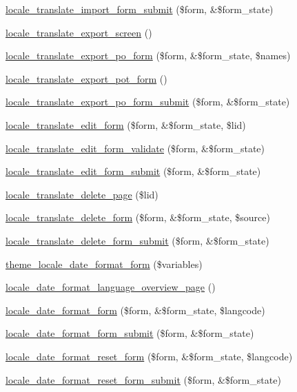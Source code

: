 \begin{DoxyCompactItemize}
\hyperlink{group__locale_gab96d979ef16a3468061ebb7e11e3210e}{locale\_\-translate\_\-import\_\-form\_\-submit} (\$form, \&\$form\_\-state)
\item 
\hyperlink{group__locale_gaa04044044d6c484553a41432db3924b4}{locale\_\-translate\_\-export\_\-screen} ()
\item 
\hyperlink{group__locale_ga5cac42d032877eb9c827b8ec0477a22e}{locale\_\-translate\_\-export\_\-po\_\-form} (\$form, \&\$form\_\-state, \$names)
\item 
\hyperlink{group__locale_ga670f0a541fc0b97da4bf4624c2afb434}{locale\_\-translate\_\-export\_\-pot\_\-form} ()
\item 
\hyperlink{group__locale_gaa8f71c53db9e03719bdeae8f594fb0ee}{locale\_\-translate\_\-export\_\-po\_\-form\_\-submit} (\$form, \&\$form\_\-state)
\item 
\hyperlink{group__locale_ga438cdd0b99e54bd87cd7058c6037db0e}{locale\_\-translate\_\-edit\_\-form} (\$form, \&\$form\_\-state, \$lid)
\item 
\hyperlink{group__locale_ga93fc48be446148e648c9a1d0f630726e}{locale\_\-translate\_\-edit\_\-form\_\-validate} (\$form, \&\$form\_\-state)
\item 
\hyperlink{group__locale_gadbeab4019dcbf389a12af893cdaad5d5}{locale\_\-translate\_\-edit\_\-form\_\-submit} (\$form, \&\$form\_\-state)
\item 
\hyperlink{group__locale_gade9664489526c09d68def1897631f4fa}{locale\_\-translate\_\-delete\_\-page} (\$lid)
\item 
\hyperlink{group__locale_gaf40a5c539ee94ae8b089275bf74e1bfe}{locale\_\-translate\_\-delete\_\-form} (\$form, \&\$form\_\-state, \$source)
\item 
\hyperlink{group__locale_ga26d7aa049b06d9de384175698f5761c7}{locale\_\-translate\_\-delete\_\-form\_\-submit} (\$form, \&\$form\_\-state)
\item 
\hyperlink{group__themeable_gafc8684caeae65fd531143223aeb5525b}{theme\_\-locale\_\-date\_\-format\_\-form} (\$variables)
\item 
\hyperlink{locale_8admin_8inc_a35d0afd550f384a5737479375ba6ada1}{locale\_\-date\_\-format\_\-language\_\-overview\_\-page} ()
\item 
\hyperlink{locale_8admin_8inc_a18cccc28c9fb6a7434ca4666e1947046}{locale\_\-date\_\-format\_\-form} (\$form, \&\$form\_\-state, \$langcode)
\item 
\hyperlink{locale_8admin_8inc_af64d7f28aed68b090c0fa48cb5f260f7}{locale\_\-date\_\-format\_\-form\_\-submit} (\$form, \&\$form\_\-state)
\item 
\hyperlink{locale_8admin_8inc_aa19c42c04454824ad9f6164ce05c9d31}{locale\_\-date\_\-format\_\-reset\_\-form} (\$form, \&\$form\_\-state, \$langcode)
\item 
\hyperlink{locale_8admin_8inc_ab87e0b22dbc23fd80968bcdf7436e565}{locale\_\-date\_\-format\_\-reset\_\-form\_\-submit} (\$form, \&\$form\_\-state)
\end{DoxyCompactItemize}


